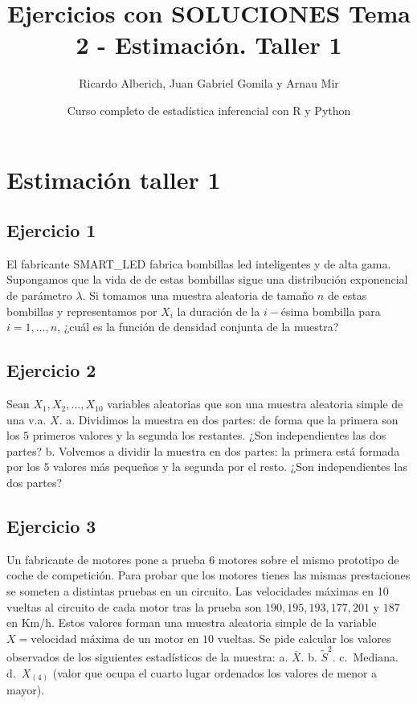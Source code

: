\documentclass[
]{article}
\title{Ejercicios con SOLUCIONES Tema 2 - Estimación. Taller 1}
\author{Ricardo Alberich, Juan Gabriel Gomila y Arnau Mir}
\date{Curso completo de estadística inferencial con R y Python}
\begin{document}
\maketitle

{
\hypersetup{linkcolor=blue}
\setcounter{tocdepth}{2}
\tableofcontents
}
\hypertarget{estimaciuxf3n-taller-1}{%
\section{Estimación taller 1}\label{estimaciuxf3n-taller-1}}

\hypertarget{ejercicio-1}{%
\subsection{Ejercicio 1}\label{ejercicio-1}}

El fabricante SMART\_LED fabrica bombillas led inteligentes y de alta
gama. Supongamos que la vida de de estas bombillas sigue una
distribución exponencial de parámetro \(\lambda\). Si tomamos una
muestra aleatoria de tamaño \(n\) de estas bombillas y representamos por
\(X_i\) la duración de la \(i-\)ésima bombilla para \(i=1,\ldots,n\),
¿cuál es la función de densidad conjunta de la muestra?

\hypertarget{ejercicio-2}{%
\subsection{Ejercicio 2}\label{ejercicio-2}}

Sean \(X_1,X_2,\ldots,X_{10}\) variables aleatorias que son una muestra
aleatoria simple de una v.a. \(X\). a. Dividimos la muestra en dos
partes: de forma que la primera son los \(5\) primeros valores y la
segunda los restantes. ¿Son independientes las dos partes? b. Volvemos a
dividir la muestra en dos partes: la primera está formada por los \(5\)
valores más pequeños y la segunda por el resto. ¿Son independientes las
dos partes?

\hypertarget{ejercicio-3}{%
\subsection{Ejercicio 3}\label{ejercicio-3}}

Un fabricante de motores pone a prueba \(6\) motores sobre el mismo
prototipo de coche de competición. Para probar que los motores tienes
las mismas prestaciones se someten a distintas pruebas en un circuito.
Las velocidades máximas en 10 vueltas al circuito de cada motor tras la
prueba son \(190,195,193,177,201\) y \(187\) en Km/h. Estos valores
forman una muestra aleatoria simple de la variable
\(X=\mbox{velocidad máxima de un motor en 10 vueltas.}\) Se pide
calcular los valores observados de los siguientes estadísticos de la
muestra: a. \(\overline{X}\). b. \(\tilde{S}^2\). c.~Mediana.
d.~\(X_{(4)}\) (valor que ocupa el cuarto lugar ordenados los valores de
menor a mayor).
\end{document}
